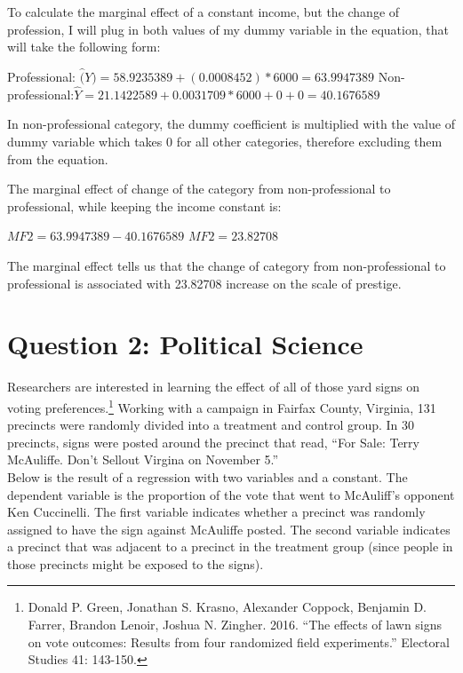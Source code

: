\documentclass[12pt,letterpaper]{article}
\begin{document}
\begin{enumerate}
	To calculate the marginal effect of a constant income, but the change of profession, I will plug in both values of my dummy variable in the equation, that will take the following form: 
	
	Professional: $\hat(Y) = 58.9235389 + (0.0008452)*6000 = 63.9947389$ 
	Non-professional:$\hat{Y} = 21.1422589 + 0.0031709*6000 + 0 + 0 = 40.1676589$
	
	In non-professional category, the dummy coefficient is multiplied with the value of dummy variable which takes 0 for all other categories, therefore excluding them from the equation. 
	
	The marginal effect of change of the category from non-professional to professional, while keeping the income constant is: 
	
	$MF2 = 63.9947389 - 40.1676589$
	$MF2 = 23.82708$
	
	The marginal effect tells us that the change of category from non-professional to professional is associated with 23.82708 increase on the scale of prestige.       
	
\end{enumerate}

\newpage

\section*{Question 2: Political Science}
\vspace{.25cm}
\noindent 	Researchers are interested in learning the effect of all of those yard signs on voting preferences.\footnote{Donald P. Green, Jonathan	S. Krasno, Alexander Coppock, Benjamin D. Farrer,	Brandon Lenoir, Joshua N. Zingher. 2016. ``The effects of lawn signs on vote outcomes: Results from four randomized field experiments.'' Electoral Studies 41: 143-150. } Working with a campaign in Fairfax County, Virginia, 131 precincts were randomly divided into a treatment and control group. In 30 precincts, signs were posted around the precinct that read, ``For Sale: Terry McAuliffe. Don't Sellout Virgina on November 5.'' \\

Below is the result of a regression with two variables and a constant.  The dependent variable is the proportion of the vote that went to McAuliff's opponent Ken Cuccinelli. The first variable indicates whether a precinct was randomly assigned to have the sign against McAuliffe posted. The second variable indicates
a precinct that was adjacent to a precinct in the treatment group (since people in those precincts might be exposed to the signs).  \\
\end{document}
